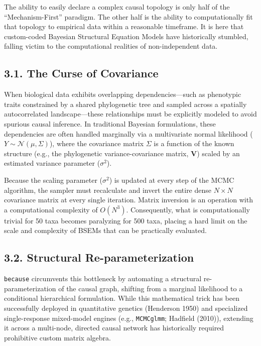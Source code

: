 \documentclass[
]{article}
\begin{document}
The ability to easily declare a complex causal topology is only half of the ``Mechanism-First'' paradigm. The other half is the ability to computationally fit that topology to empirical data within a reasonable timeframe. It is here that custom-coded Bayesian Structural Equation Models have historically stumbled, falling victim to the computational realities of non-independent data.

\subsection{3.1. The Curse of Covariance}\label{the-curse-of-covariance}

When biological data exhibits overlapping dependencies---such as phenotypic traits constrained by a shared phylogenetic tree and sampled across a spatially autocorrelated landscape---these relationships must be explicitly modeled to avoid spurious causal inference. In traditional Bayesian formulations, these dependencies are often handled marginally via a multivariate normal likelihood (\(Y \sim \mathcal{N}(\mu, \Sigma)\)), where the covariance matrix \(\Sigma\) is a function of the known structure (e.g., the phylogenetic variance-covariance matrix, \(\mathbf{V}\)) scaled by an estimated variance parameter (\(\sigma^2\)).

Because the scaling parameter (\(\sigma^2\)) is updated at every step of the MCMC algorithm, the sampler must recalculate and invert the entire dense \(N \times N\) covariance matrix at every single iteration. Matrix inversion is an operation with a computational complexity of \(O(N^3)\). Consequently, what is computationally trivial for 50 taxa becomes paralyzing for 500 taxa, placing a hard limit on the scale and complexity of BSEMs that can be practically evaluated.

\subsection{3.2. Structural Re-parameterization}\label{structural-re-parameterization}

\texttt{because} circumvents this bottleneck by automating a structural re-parameterization of the causal graph, shifting from a marginal likelihood to a conditional hierarchical formulation. While this mathematical trick has been successfully deployed in quantitative genetics (Henderson 1950) and specialized single-response mixed-model engines (e.g., \texttt{MCMCglmm}; Hadfield (2010)), extending it across a multi-node, directed causal network has historically required prohibitive custom matrix algebra.
\end{document}
